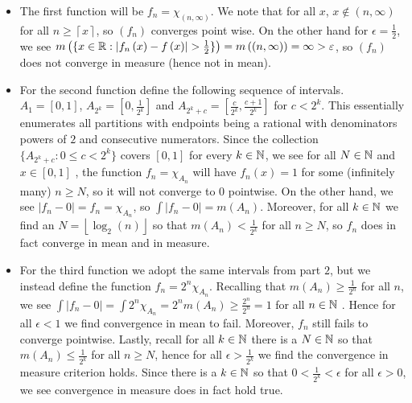 \documentclass[a4paper]{article}
\begin{document}
\begin{problem}[40]
	\begin{itemize}
		\item The first function will be \(f_{n} = \chi_{\left( n, \infty \right) }\). We note that for all \(x \), \(x \not\in \left( n, \infty \right) \) for all \(n \ge \left\lceil x \right\rceil \), so \(\left( f_{n} \right) \) converges point wise. On the other hand for \(\epsilon = \frac{1}{2}\), we see \(m\left( \{x \in \mathbb{R} : \left| f_{n}\left( x \right) - f\left( x \right)  \right| > \frac{1}{2}\}  \right)  = m\left( \left( n, \infty \right)  \right) = \infty > \varepsilon\), so \(\left( f_{n} \right) \) does not converge in measure (hence not in mean).
		\item For the second function define the following sequence of intervals. \(A_{1} = \left[ 0, 1 \right] \), \(A_{2^{k}} = \left[ 0, \frac{1}{2^{k}} \right] \) and \(A_{2^{k} + c} = \left[ \frac{c}{2^{k}}, \frac{c+1}{2^{k}} \right] \) for \(c < 2^{k}\). This essentially enumerates all partitions with endpoints being a rational with denominators powers of \(2\) and consecutive numerators. Since the collection \(\{A_{2^{k} + c} : 0 \le c < 2^{k}\} \) covers \(\left[ 0, 1 \right] \) for every \(k \in \mathbb{N}\), we see  for all \(N \in \mathbb{N}\) and \(x \in \left[ 0, 1 \right] \) , the function \(f_{n} = \chi_{A_{n}}\) will have \(f_{n}\left( x \right) = 1\) for some (infinitely many) \(n \ge N\), so it will not converge to \(0\) pointwise. On the other hand, we see \(\left| f_{n} - 0 \right|= f_{n} = \chi_{A_{n}}\), so \(\int \left| f_{n} - 0 \right| = m\left( A_{n} \right) \). Moreover, for all \(k \in \mathbb{N}\) we find an \(N = \left\lfloor \log_{2}\left( n \right)  \right\rfloor\) so that \(m\left( A_{n} \right) < \frac{1}{2^{k}} \) for all \(n \ge N\), so \(f_{n}\) does in fact converge in mean and in measure.
		\item For the third function we adopt the same intervals from part \(2\), but we instead define the function \(f_{n} = 2^{n} \chi_{A_{n}}\). Recalling that \(m\left( A_{n} \right)\ge \frac{1}{2^{n}} \) for all \(n\), we see \(\int \left| f_{n} - 0 \right|  = \int 2^{n} \chi_{A_{n}} = 2^{n} m\left( A_{n} \right) \ge \frac{2^{n}}{2^{n}} = 1\) for all \(n \in \mathbb{N}\) . Hence for all \(\epsilon < 1\) we find convergence in mean to fail. Moreover, \(f_{n}\) still fails to converge pointwise. Lastly, recall for all \(k \in \mathbb{N}\) there is a \(N \in \mathbb{N}\) so that \(m\left( A_{n} \right)\le \frac{1}{2^{k}} \) for all \(n \ge N\), hence for all \(\epsilon > \frac{1}{2^{k}}\)  we find the convergence in measure criterion holds. Since there is a \(k \in \mathbb{N}\) so that \(0 < \frac{1}{2^{k}} < \epsilon\) for all \(\epsilon > 0\), we see convergence in measure does in fact hold true.
	\end{itemize}
\end{problem}
\end{document}
